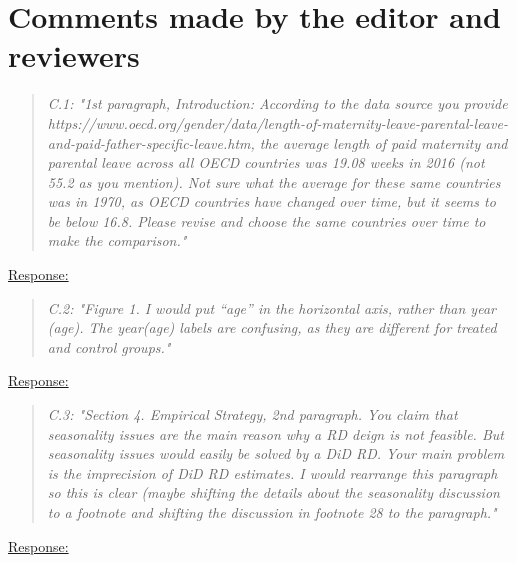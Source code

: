 
\clearpage
\section{Comments made by the editor and reviewers}


{}
\begin{quote}
\textit{C.1: "1st paragraph, Introduction: According to the data source you provide https://www.oecd.org/gender/data/length-of-maternity-leave-parental-leave-and-paid-father-specific-leave.htm, the average length of paid maternity and parental leave across all OECD countries was 19.08 weeks in 2016 (not 55.2 as you mention). Not sure what the average for these same countries was in 1970, as OECD countries have changed over time, but it seems to be below 16.8. Please revise and choose the same countries over time to make the comparison."}
\end{quote}

\underline{Response:} 





{}
\bigskip
\begin{quote}
	\textit{C.2: "Figure 1. I would put “age” in the horizontal axis, rather than year (age). The year(age) labels are confusing, as they are different for treated and control groups."}
\end{quote}
\underline{Response:}











\bigskip
{}
\begin{quote}
	\textit{C.3: "Section 4. Empirical Strategy, 2nd paragraph. You claim that seasonality issues are the main reason why a RD deign is not feasible. But seasonality issues would easily be solved by a DiD RD. Your main problem is the imprecision of DiD RD estimates. I would rearrange this paragraph so this is clear (maybe shifting the details about the seasonality discussion to a footnote and shifting the discussion in footnote 28 to the paragraph."}
\end{quote}
\underline{Response:}











